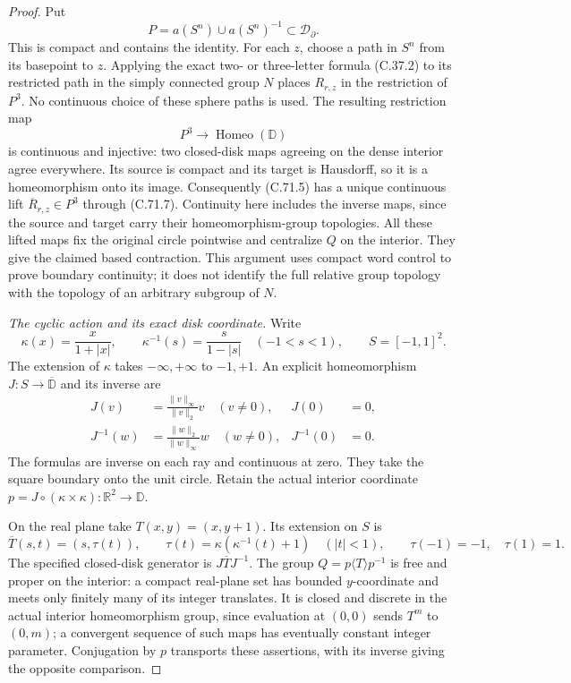 \begin{proof}
Put
\[
 P=a(S^n)\cup a(S^n)^{-1}\subset\mathcal D_\partial .
                                                               \tag{C.71.6}
\]
This is compact and contains the identity. For each $z$,
choose a path in $S^n$ from its basepoint to $z$.
Applying the exact two- or three-letter formula (C.37.2)
to its restricted path in the simply connected group $N$
places $R_{r,z}$ in the restriction of $P^3$.
No continuous choice of these sphere paths is used.
The resulting restriction map
\[
                  P^3\longrightarrow
                         \operatorname{Homeo}(\mathbb D)
                                                               \tag{C.71.7}
\]
is continuous and injective: two closed-disk maps agreeing
on the dense interior agree everywhere. Its source is
compact and its target is Hausdorff, so it is a
homeomorphism onto its image. Consequently (C.71.5)
has a unique continuous lift
$\overline R_{r,z}\in P^3$ through (C.71.7).
Continuity here includes the inverse maps, since the
source and target carry their homeomorphism-group
topologies. All these lifted maps fix the original
circle pointwise and centralize $Q$ on the interior.
They give the claimed based contraction. This argument
uses compact word control to prove boundary continuity;
it does not identify the full relative group topology
with the topology of an arbitrary subgroup of $N$.

\emph{The cyclic action and its exact disk coordinate.}
Write
\[
 \kappa(x)=\frac{x}{1+|x|},\qquad
 \kappa^{-1}(s)=\frac{s}{1-|s|}\quad(-1<s<1),
 \qquad S=[-1,1]^2.
                                                               \tag{C.71.8}
\]
The extension of $\kappa$ takes $-\infty,+\infty$ to
$-1,+1$. An explicit homeomorphism $J:S\to
\overline{\mathbb D}$ and its inverse are
\[
 \begin{aligned}
 J(v)&=\frac{\|v\|_\infty}{\|v\|_2}v\quad(v\ne0),
                          &J(0)&=0,\\
 J^{-1}(w)&=\frac{\|w\|_2}{\|w\|_\infty}w\quad(w\ne0),
                          &J^{-1}(0)&=0 .
 \end{aligned}                                                   \tag{C.71.9}
\]
The formulas are inverse on each ray and continuous at
zero. They take the square boundary onto the unit circle.
Retain the actual interior coordinate
$p=J\circ(\kappa\times\kappa):\mathbb R^2\to\mathbb D$.

On the real plane take $T(x,y)=(x,y+1)$.
Its extension on $S$ is
\[
 \overline T(s,t)=(s,\tau(t)),\qquad
 \tau(t)=\kappa(\kappa^{-1}(t)+1)\quad(|t|<1),
       \qquad\tau(-1)=-1,\quad\tau(1)=1.
                                                               \tag{C.71.10}
\]
The specified closed-disk generator is
$J\overline T J^{-1}$. The group
$Q=p\langle T\rangle p^{-1}$ is free and proper on
the interior: a compact real-plane set has bounded
$y$-coordinate and meets only finitely many of its
integer translates. It is closed and discrete in the
actual interior homeomorphism group, since evaluation
at $(0,0)$ sends $T^m$ to $(0,m)$; a convergent sequence
of such maps has eventually constant integer parameter.
Conjugation by $p$ transports these assertions, with
its inverse giving the opposite comparison.


\end{proof}
